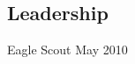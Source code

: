 \documentclass[line, margin]{res}
\begin{document}
\begin{resume}
\section{Leadership}
	Eagle Scout \hfill {May 2010}


\end{resume}
\end{document}
